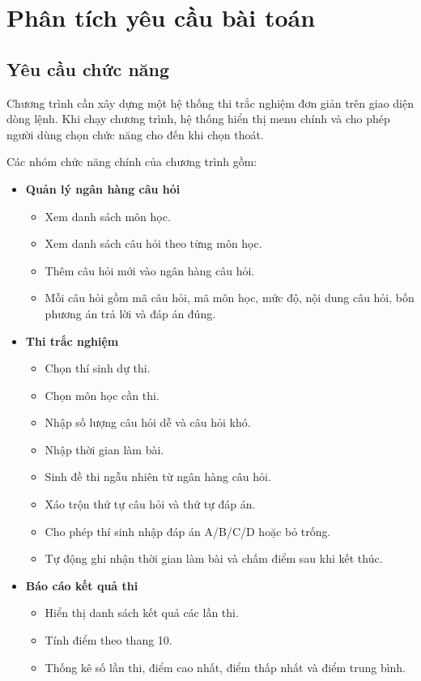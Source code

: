 \documentclass[12pt,a4paper]{report}
\begin{document}
\section{Phân tích yêu cầu bài toán}

\subsection{Yêu cầu chức năng}

Chương trình cần xây dựng một hệ thống thi trắc nghiệm đơn giản trên giao diện dòng lệnh. Khi chạy chương trình, hệ thống hiển thị menu chính và cho phép người dùng chọn chức năng cho đến khi chọn thoát.

Các nhóm chức năng chính của chương trình gồm:

\begin{itemize}
    \item \textbf{Quản lý ngân hàng câu hỏi}
    \begin{itemize}
        \item Xem danh sách môn học.
        \item Xem danh sách câu hỏi theo từng môn học.
        \item Thêm câu hỏi mới vào ngân hàng câu hỏi.
        \item Mỗi câu hỏi gồm mã câu hỏi, mã môn học, mức độ, nội dung câu hỏi, bốn phương án trả lời và đáp án đúng.
    \end{itemize}

    \item \textbf{Thi trắc nghiệm}
    \begin{itemize}
        \item Chọn thí sinh dự thi.
        \item Chọn môn học cần thi.
        \item Nhập số lượng câu hỏi dễ và câu hỏi khó.
        \item Nhập thời gian làm bài.
        \item Sinh đề thi ngẫu nhiên từ ngân hàng câu hỏi.
        \item Xáo trộn thứ tự câu hỏi và thứ tự đáp án.
        \item Cho phép thí sinh nhập đáp án A/B/C/D hoặc bỏ trống.
        \item Tự động ghi nhận thời gian làm bài và chấm điểm sau khi kết thúc.
    \end{itemize}

    \item \textbf{Báo cáo kết quả thi}
    \begin{itemize}
        \item Hiển thị danh sách kết quả các lần thi.
        \item Tính điểm theo thang 10.
        \item Thống kê số lần thi, điểm cao nhất, điểm thấp nhất và điểm trung bình.
    \end{itemize}
\end{itemize}
\end{document}
